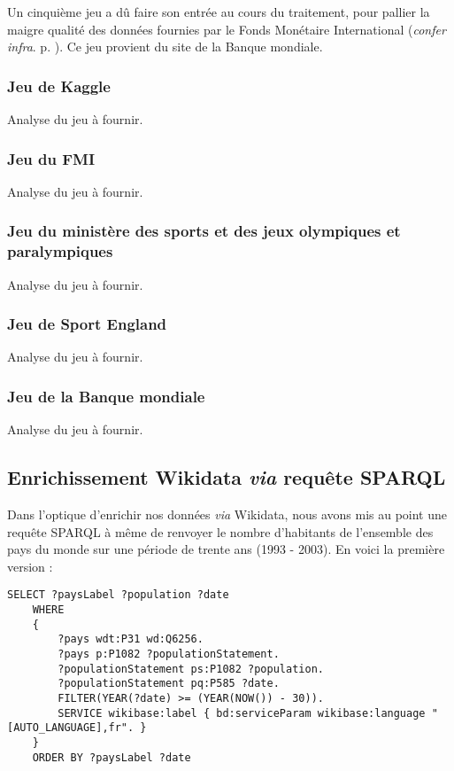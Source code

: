 \documentclass[hidelinks, 12pt]{article}
\begin{document}
Un cinquième jeu a dû faire son entrée au cours du traitement, pour pallier la maigre qualité des données fournies par le Fonds Monétaire International (\emph{confer infra}. p. \pageref{banquemondiale}). Ce jeu provient du site de la Banque mondiale\autocite{worldbank}.

\subsubsection{Jeu de Kaggle}
		
Analyse du jeu à fournir.

\subsubsection{Jeu du FMI}
		
Analyse du jeu à fournir.
		
\subsubsection{Jeu du ministère des sports et des jeux olympiques et paralympiques}
		
Analyse du jeu à fournir.
		
\subsubsection{Jeu de Sport England}

Analyse du jeu à fournir.
		
\subsubsection{Jeu de la Banque mondiale}
		
Analyse du jeu à fournir.
		
\subsection{Enrichissement Wikidata \emph{via} requête SPARQL}

Dans l'optique d'enrichir nos données \emph{via} Wikidata, nous avons mis au point une requête SPARQL à même de renvoyer le nombre d'habitants de l'ensemble des pays du monde sur une période de trente ans (1993 - 2003). En voici la première version :
		
\begin{lstlisting}[language=SPARQL]
	SELECT ?paysLabel ?population ?date
	WHERE
	{
		?pays wdt:P31 wd:Q6256.
		?pays p:P1082 ?populationStatement.
		?populationStatement ps:P1082 ?population.
		?populationStatement pq:P585 ?date.
		FILTER(YEAR(?date) >= (YEAR(NOW()) - 30)).
		SERVICE wikibase:label { bd:serviceParam wikibase:language "[AUTO_LANGUAGE],fr". }
	}
	ORDER BY ?paysLabel ?date
\end{lstlisting}
\end{document}
